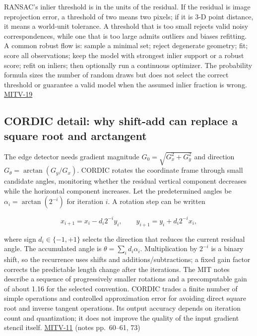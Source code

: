 RANSAC's inlier threshold is in the units of the residual. If the residual is image reprojection error, a threshold of two means two pixels; if it is 3-D point distance, it means a world-unit tolerance. A threshold that is too small rejects valid noisy correspondences, while one that is too large admits outliers and biases refitting. A common robust flow is: sample a minimal set; reject degenerate geometry; fit; score all observations; keep the model with strongest inlier support or a robust score; refit on inliers; then optionally run a continuous optimizer. The probability formula sizes the number of random draws but does not select the correct threshold or guarantee a valid model when the assumed inlier fraction is wrong. \hyperref[04-visual-computing-ii-ch036-mitv-19---absolute-orientation-in-closed-form-outliers-and-robustness-ransac]{MITV-19}

\subsection{CORDIC detail: why shift-add can replace a square root and arctangent}\label{04-visual-computing-ii-ch032-cordic-detail-why-shift-add-can-replace-a-square-root-and-arctangent}

The edge detector needs gradient magnitude \(G_0=\sqrt{G_x^2+G_y^2}\) and direction \(G_\theta=\arctan(G_y/G_x)\). CORDIC rotates the coordinate frame through small candidate angles, monitoring whether the residual vertical component decreases while the horizontal component increases. Let the predetermined angles be \(\alpha_i=\arctan(2^{-i})\) for iteration \(i\). A rotation step can be written

\[
x_{i+1}=x_i-d_i2^{-i}y_i,\qquad y_{i+1}=y_i+d_i2^{-i}x_i,
\]

where sign \(d_i\in\{-1,+1\}\) selects the direction that reduces the current residual angle. The accumulated angle is \(\theta=\sum_i d_i\alpha_i\). Multiplication by \(2^{-i}\) is a binary shift, so the recurrence uses shifts and additions/subtractions; a fixed gain factor corrects the predictable length change after the iterations. The MIT notes describe a sequence of progressively smaller rotations and a precomputable gain of about 1.16 for the selected convention. CORDIC trades a finite number of simple operations and controlled approximation error for avoiding direct square root and inverse tangent operations. Its output accuracy depends on iteration count and quantization; it does not improve the quality of the input gradient stencil itself. \hyperref[04-visual-computing-ii-ch036-mitv-11---edge-detection-subpixel-position-cordic-line-detection-us-6408109]{MITV-11} (notes pp.~60--61, 73)

